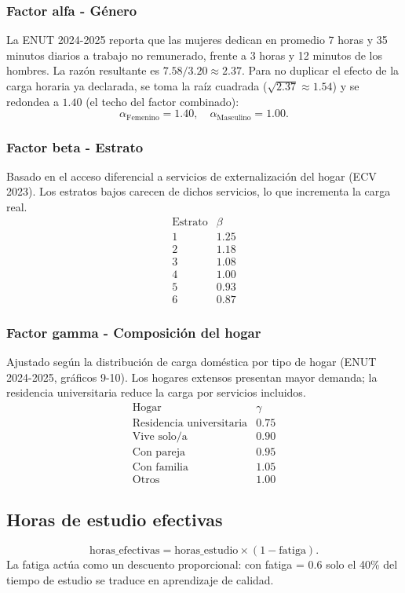\documentclass[12pt, spanish]{article}
\begin{document}
\subsubsection{Factor alfa - Género}
La ENUT 2024-2025 reporta que las mujeres dedican en promedio 7 horas y 35 minutos diarios a trabajo no remunerado, frente a 3 horas y 12 minutos de los hombres. La razón resultante es \(7.58 / 3.20 \approx 2.37\). Para no duplicar el efecto de la carga horaria ya declarada, se toma la raíz cuadrada (\(\sqrt{2.37}\approx 1.54\)) y se redondea a \(1.40\) (el techo del factor combinado):
\[
\alpha_{\text{Femenino}} = 1.40,\quad \alpha_{\text{Masculino}} = 1.00.
\]

\subsubsection{Factor beta - Estrato}
Basado en el acceso diferencial a servicios de externalización del hogar (ECV 2023). Los estratos bajos carecen de dichos servicios, lo que incrementa la carga real.
\[
\begin{array}{c|c}
\text{Estrato} & \beta \\ \hline
1 & 1.25 \\
2 & 1.18 \\
3 & 1.08 \\
4 & 1.00 \\
5 & 0.93 \\
6 & 0.87
\end{array}
\]

\subsubsection{Factor gamma - Composición del hogar}
Ajustado según la distribución de carga doméstica por tipo de hogar (ENUT 2024-2025, gráficos 9-10). Los hogares extensos presentan mayor demanda; la residencia universitaria reduce la carga por servicios incluidos.
\[
\begin{array}{c|c}
\text{Hogar} & \gamma \\ \hline
\text{Residencia universitaria} & 0.75 \\
\text{Vive solo/a} & 0.90 \\
\text{Con pareja} & 0.95 \\
\text{Con familia} & 1.05 \\
\text{Otros} & 1.00
\end{array}
\]

\subsection{Horas de estudio efectivas}
\[
\text{horas\_efectivas} = \text{horas\_estudio} \times (1 - \text{fatiga}).
\]
La fatiga actúa como un descuento proporcional: con fatiga = 0.6 solo el 40\% del tiempo de estudio se traduce en aprendizaje de calidad.
\end{document}
